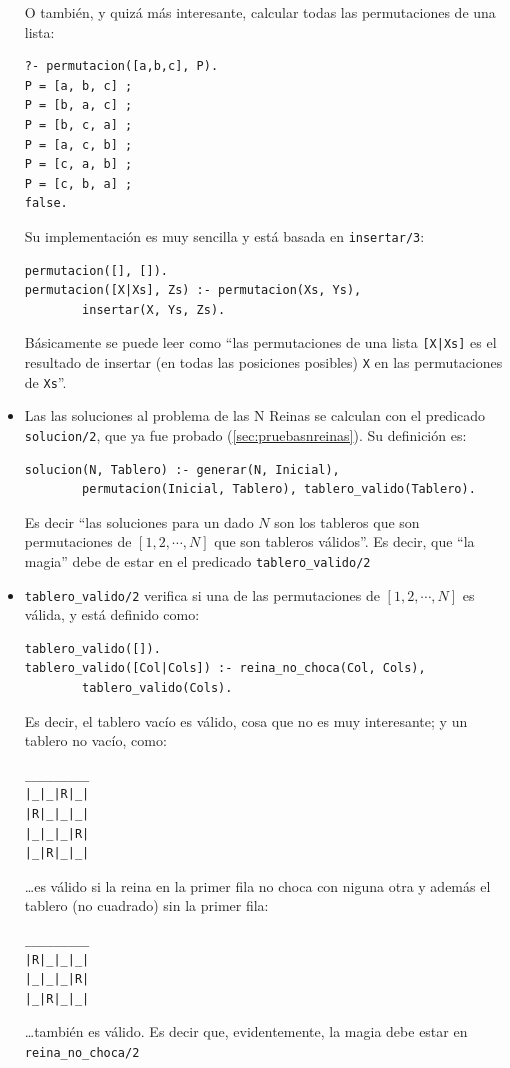 \documentclass[12pt,titlepage]{article}
\begin{document}
\begin{itemize}
O también, y quizá más interesante, calcular todas las permutaciones de una lista:
\begin{lstlisting}
?- permutacion([a,b,c], P).
P = [a, b, c] ;
P = [b, a, c] ;
P = [b, c, a] ;
P = [a, c, b] ;
P = [c, a, b] ;
P = [c, b, a] ;
false.
\end{lstlisting}

Su implementación es muy sencilla y está basada en \lstinline|insertar/3|:
\begin{lstlisting}
permutacion([], []).
permutacion([X|Xs], Zs) :- permutacion(Xs, Ys), 
        insertar(X, Ys, Zs).
\end{lstlisting}

Básicamente se puede leer como ``las permutaciones de una lista \lstinline$[X|Xs]$ es el resultado de insertar (en todas las posiciones posibles) \lstinline$X$ en las permutaciones de \lstinline$Xs$''.

\item Las las soluciones al problema de las N Reinas se calculan con el predicado \lstinline|solucion/2|, que ya fue probado (\ref{sec:pruebasnreinas}). Su definición es:
\begin{lstlisting}
solucion(N, Tablero) :- generar(N, Inicial), 
        permutacion(Inicial, Tablero), tablero_valido(Tablero).
\end{lstlisting}
Es decir ``las soluciones para un dado $N$ son los tableros que son permutaciones de $[1, 2, \cdots, N]$ que son tableros válidos''. Es decir, que ``la magia'' debe de estar en el predicado \lstinline$tablero_valido/2$

\item \lstinline$tablero_valido/2$ verifica si una de las permutaciones de $[1, 2, \cdots, N]$ es válida, y está definido como:
\begin{lstlisting}
tablero_valido([]).
tablero_valido([Col|Cols]) :- reina_no_choca(Col, Cols), 
        tablero_valido(Cols).
\end{lstlisting}

Es decir, el tablero vacío es válido, cosa que no es muy interesante; y un tablero no vacío, como:
\begin{Verbatim}[samepage=true]
_________
|_|_|R|_|
|R|_|_|_|
|_|_|_|R|
|_|R|_|_|
\end{Verbatim}

\dots es válido si la reina en la primer fila no choca con niguna otra y además el tablero (no cuadrado) sin la primer fila:
\begin{Verbatim}[samepage=true]
_________
|R|_|_|_|
|_|_|_|R|
|_|R|_|_|
\end{Verbatim}
\dots también es válido. Es decir que, evidentemente, la magia debe estar en \lstinline|reina_no_choca/2|


\end{itemize}
\end{document}
